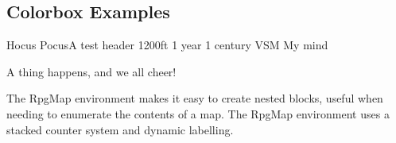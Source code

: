 		\subsection{Colorbox Examples}
	


			

		\begin{spell}{Hocus Pocus}{A test header}
			{1200ft}
			{1 year}
			{1 century}
			{VSM}
			{My mind}

			A thing happens, and we all cheer!
		\end{spell}


		The RpgMap environment makes it easy to create nested blocks, useful when needing to enumerate the contents of a map. The RpgMap environment uses a stacked counter system and dynamic labelling.
		
			

